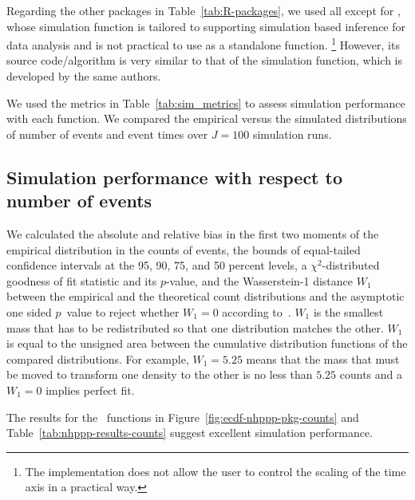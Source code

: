 \documentclass[article]{jss}\usepackage[]{graphicx}\usepackage[]{xcolor}
\begin{document}
Regarding the other  packages in Table~\ref{tab:R-packages}, we used all except for , whose simulation function is tailored to supporting simulation based inference for data analysis and is not practical to use as a standalone function.%
\footnote{The implementation does not allow the user to control the scaling of the time axis in a practical way.}
However, its source code/algorithm is very similar to that of the  simulation function, which is developed by the same authors.

We used the metrics in Table~\ref{tab:sim_metrics} to assess simulation performance with each function. We compared the empirical versus the simulated distributions of number of events and event times over $J = 100$ simulation runs.

\subsection{Simulation performance with respect to number of events}\label{sec:sim-counts}

We calculated the absolute and relative bias in the first two moments of the empirical distribution in the counts of events, the bounds of equal-tailed confidence intervals at the 95, 90, 75, and 50 percent levels, a $\chi^2$-distributed goodness of fit statistic and its $p$-value, and the Wasserstein-1 distance $W_1$ between the empirical and the theoretical count distributions and the asymptotic one sided $p$~value to reject whether $W_1 = 0$ according to~\citet{sommerfeld2018inference}. $W_1$ is the smallest mass that has to be redistributed so that one distribution matches the other. $W_1$ is equal to the unsigned area between the cumulative distribution functions of the compared distributions. For example, $W_1 = 5.25$ means that the mass that must be moved to transform one density to the other is no less than $5.25$ counts and a $W_1 = 0$ implies perfect fit.





The results for the~ functions in Figure~\ref{fig:ecdf-nhppp-pkg-counts} and Table~\ref{tab:nhppp-results-counts} suggest excellent simulation performance.
\end{document}
